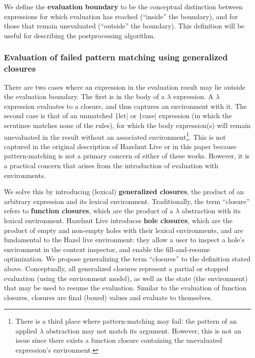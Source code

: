 We define the \textbf{evaluation boundary} to be the conceptual distinction between expressions for which evaluation has reached (``inside'' the boundary), and for those that remain unevaluated (``outside'' the boundary). This definition will be useful for describing the postprocessing algorithm.

\subsubsection{Evaluation of failed pattern matching using generalized closures}
\label{sec:failed_pattern_match}

There are two cases where an expression in the evaluation result may lie outside the evaluation boundary. The first is in the body of a $\lambda$ expression. A $\lambda$ expression evaluates to a closure, and thus captures an environment with it. The second case is that of an unmatched \texttt|let| or \texttt|case| expression (in which the scrutinee matches none of the rules), for which the body expression(s) will remain unevaluated in the result without an associated environment\footnote{There is a third place where pattern-matching may fail: the pattern of an applied $\lambda$ abstraction may not match its argument. However, this is not an issue since there exists a function closure containing the unevaluated expression's environment.}. This is not captured in the original description of Hazelnut Live \cite{conf/popl/HazelnutLive19} or in this paper because pattern-matching is not a primary concern of either of these works. However, it is a practical concern that arises from the introduction of evaluation with environments.

We solve this by introducing (lexical) \textbf{generalized closures}, the product of an arbitrary expression and its lexical environment. Traditionally, the term ``closure'' refers to \textbf{function closures}, which are the product of a $\lambda$ abstraction with its lexical environment. Hazelnut Live \cite{conf/popl/HazelnutLive19} introduces \textbf{hole closures}, which are the product of empty and non-empty holes with their lexical environments, and are fundamental to the Hazel live environment: they allow a user to inspect a hole's environment in the context inspector, and enable the fill-and-resume optimization. We propose generalizing the term ``closures'' to the definition stated above. Conceptually, all generalized closures represent a partial or stopped evaluation (using the environment model), as well as the state (the environment) that may be used to resume the evaluation. Similar to the evaluation of function closures, closures are final (boxed) values and evaluate to themselves.


